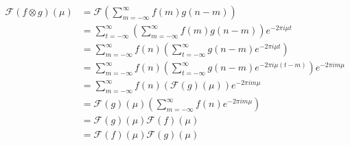 \documentclass[a4paper]{article}
\begin{document}
\begin{align*}
\mathcal{F}(f\otimes g)(\mu)&=\mathcal{F}\left(\sum_{m=-\infty}^{\infty}f(m)g(n-m)\right)
		     \\&=\sum_{t=-\infty}^{\infty}\left(\sum_{m=-\infty}^{\infty}f(m)g(n-m)\right)e^{-2\pi i\mu t}
		     \\&=\sum_{m=-\infty}^{\infty}f(n)\left(\sum_{t=-\infty}^{\infty}g(n-m)e^{-2\pi i\mu t}\right)
		     \\&=\sum_{m=-\infty}^{\infty}f(n)\left(\sum_{t=-\infty}^{\infty}g(n-m)e^{-2\pi i\mu(t-m)}\right)e^{-2\pi im\mu}
		     \\&=\sum_{m=-\infty}^{\infty}f(n)\left(\mathcal{F}(g)(\mu)\right)e^{-2\pi im\mu}
		     \\&=\mathcal{F}(g)(\mu)\left(\sum_{m=-\infty}^{\infty}f(n)e^{-2\pi im\mu}\right)
		     \\&=\mathcal{F}(g)(\mu)\mathcal{F}(f)(\mu)
		     \\&=\mathcal{F}(f)(\mu)\mathcal{F}(g)(\mu)
\end{align*}
\end{document}
